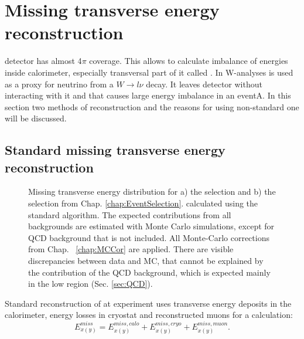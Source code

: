 \section{Missing transverse energy reconstruction}\label{sec:EtMissRec}
\atlas detector has almost 4$\pi$ coverage. This allows to calculate imbalance of energies inside calorimeter, especially transversal part of it called \etmiss.  In W-analyses \etmiss is used as a proxy for neutrino from a $W \to l\nu$ decay. It leaves detector without interacting with it and that causes large energy imbalance in an eventA. In this section two methods of \etmiss reconstruction and the reasons for using non-standard one will be discussed.

\subsection{Standard missing transverse energy reconstruction}

\begin{figure}[!tb]
\begin{minipage}[h]{0.49\linewidth}
\end{minipage}
\hfill
\begin{minipage}[h]{0.49\linewidth}
\end{minipage}
\caption{Missing transverse energy distribution for a) the \wenu selection and  b) the \wmunu selection from Chap. \ref{chap:EventSelection}. \etmiss  calculated using the standard \atlas algorithm. The expected contributions from all backgrounds are estimated with Monte Carlo simulations, except for QCD background that is not included. All Monte-Carlo corrections from Chap. ~\ref{chap:MCCor} are applied. There are visible discrepancies between data and MC, that cannot be explained by the contribution of the QCD background, which is expected mainly in the low \etmiss region (Sec. \ref{sec:QCD}).}
\label{ris:EtMissRefFinal}
\end{figure}

Standard reconstruction of \etmiss at \atlas experiment \cite{Aad2012} uses transverse energy deposits in the calorimeter, energy losses in cryostat and reconstructed muons for a calculation:
\begin{equation}
E_{x(y)}^{miss} = E_{x(y)}^{miss, calo} +  E_{x(y)}^{miss, cryo} +  E_{x(y)}^{miss, muon}.
\end{equation}


